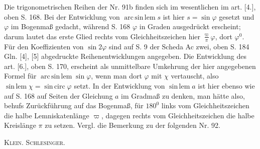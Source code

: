 Die trigonometrischen Reihen der Nr. 91b finden sich im wesentlichen im art. [4.], oben S. 168. Bei der Entwicklung von \(\operatorname{arc\,sin\,lem}s\) ist hier \(s=\sin\varphi\) gesetzt und \(\varphi\) im Bogenmaß gedacht, während S. 168 \(\varphi\) in Graden ausgedrückt erscheint; darum lautet das erste Glied rechts vom Gleichheitszeichen hier \(\frac\varpi\pi\varphi\), dort \(\varphi^0\). Für den Koeffizienten von \(\sin2\varphi\) sind auf S. 9 der Scheda Ac zwei, oben S. 184 Gln. [4], [5] abgedruckte Reihenentwicklungen angegeben. Die Entwicklung des art. [6.], oben S. 170, erscheint als unmittelbare Umkehrung der hier angegebenen Formel für \(\operatorname{arc\,sin\,lem}\sin\varphi\), wenn man dort \(\varphi\) mit \(\chi\) vertauscht, also \(\operatorname{sin\,lem}\chi=\operatorname{sin\,circ}\varphi\) setzt. In der Entwicklung von \(\operatorname{sin\,lem}a\) ist hier ebenso wie auf S. 168 auf  Seiten der Gleichung \(a\) im Gradmaß zu denken, man hätte also, behufs Zurückführung auf das Bogenmaß, für \(180^0\) links vom Gleichheitszeichen die halbe Lemniskatenlänge \(\varpi\), dagegen rechts vom Gleichheitszeichen die halbe Kreislänge \(\pi\) zu setzen. Vergl. die Bemerkung zu der folgenden Nr. 92.
\par\noindent\hfill\textsc{Klein. Schlesinger.}
\par\endgroup
